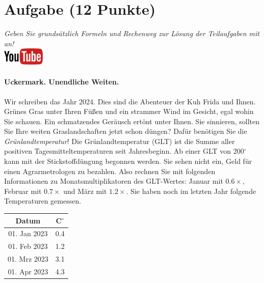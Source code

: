 \documentclass[a4paper, 9pt]{scrartcl}\usepackage[]{graphicx}\usepackage[]{xcolor}
\begin{document}
\clearpage

\section{Aufgabe \hfill (12 Punkte)}

\textit{Geben Sie grunds{\"a}tzlich Formeln und Rechenweg zur L{\"o}sung der
  Teilaufgaben mit an!} \\[1Ex]

\hfill\href{https://youtu.be/fiWGgCX-cE4}{\includegraphics[width =
  2cm]{img/youtube}} %
\hspace{2Ex}



\paragraph{Uckermark. Unendliche Weiten.}



Wir schreiben das Jahr 2024. Dies sind die Abenteuer
der Kuh Frida und Ihnen. Gr{\"u}nes Gras unter Ihren F{\"u}{\ss}en und
ein strammer Wind im Gesicht, egal wohin Sie schauen. Ein schmatzendes
Ger{\"a}usch ert{\"o}nt unter Ihnen. Sie sinnieren, sollten Sie Ihre weiten
Graslandschaften jetzt schon d{\"u}ngen?  Daf{\"u}r ben{\"o}tigen Sie die
\textit{Gr{\"u}nlandtemperatur}! Die Gr{\"u}nlandtemperatur (GLT) ist die Summe aller
positiven Tagesmitteltemperaturen seit Jahresbeginn. Ab einer GLT von
200$^\circ$ kann mit der Stickstoffd{\"u}ngung begonnen werden. Sie sehen nicht
ein, Geld f{\"u}r einen Agrarmetrologen zu bezahlen. Also rechnen Sie mit
folgenden Informationen zu Monatsmultiplikatoren des GLT-Wertes: Januar mit
$0.6\times$, Februar mit $0.7\times$ und M{\"a}rz mit
$1.2\times$. Sie haben noch im letzten Jahr folgende Temperaturen
gemessen.

\begin{center}
\begin{tabular}{cc}
  \toprule
  Datum & C$^\circ$ \\
  \midrule
  01. Jan 2023 & 0.4\\
  01. Feb 2023 & 1.2\\
  01. Mrz 2023 & 3.1\\
  01. Apr 2023 & 4.3\\
  \bottomrule
\end{tabular}
\end{center}
\end{document}

